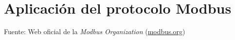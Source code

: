 
\cleardoublepage
\chapter{Aplicación del protocolo Modbus}

\label{chap:anexoModbus} %

\large Fuente: Web oficial de la \textit{Modbus Organization} (\href{http://modbus.org}{modbus.org})

